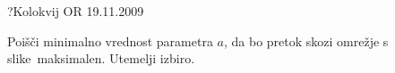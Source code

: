 \begin{naloga}{?}{Kolokvij OR 19.11.2009}
\begin{vprasanje}
Poišči minimalno vrednost parametra $a$,
da bo pretok skozi omrežje s slike~\fig maksimalen.
Utemelji izbiro.

\begin{slika}
\pgfslika
{}
\end{slika}
\end{vprasanje}
\begin{odgovor}
\end{odgovor}
\end{naloga}
